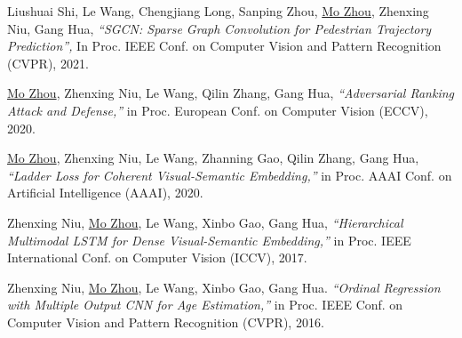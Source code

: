 \documentclass[10pt,margin,line,pifont,palatino,courier]{res}
\begin{document}
\begin{resume}
\begin{enumerate}[noitemsep, leftmargin=*, label={[C{\arabic*}]}]
\item Liushuai Shi, Le Wang,
\reversemarginpar{}
Chengjiang Long, Sanping Zhou, \underline{Mo Zhou}, Zhenxing Niu, Gang Hua,
\textit{``SGCN: Sparse Graph Convolution for Pedestrian Trajectory Prediction'',}
In Proc. IEEE Conf. on Computer Vision and Pattern Recognition (CVPR), 2021.

\item \underline{Mo Zhou},
\reversemarginpar{}
Zhenxing Niu, Le Wang, Qilin Zhang, Gang Hua,
\textit{``Adversarial Ranking Attack and Defense,''}
in Proc. European Conf. on Computer Vision (ECCV), 2020.

\item  \underline{Mo Zhou},
\reversemarginpar{}
Zhenxing Niu, Le Wang, Zhanning Gao, Qilin Zhang, Gang Hua,
\textit{``Ladder Loss for Coherent Visual-Semantic Embedding,''}
in Proc. AAAI Conf. on Artificial Intelligence (AAAI), 2020.

\item Zhenxing Niu,
\reversemarginpar{}
\underline{Mo Zhou}, Le Wang, Xinbo Gao, Gang Hua,
\textit{``Hierarchical Multimodal LSTM for Dense Visual-Semantic Embedding,''}
in Proc. IEEE International Conf. on Computer Vision (ICCV), 2017.

\item Zhenxing Niu,
\reversemarginpar{}
\underline{Mo Zhou}, Le Wang, Xinbo Gao, Gang Hua.
\textit{``Ordinal Regression with Multiple Output CNN for Age Estimation,''}
in Proc. IEEE Conf. on Computer Vision and Pattern Recognition (CVPR), 2016.


\end{enumerate}
\end{resume}
\end{document}
